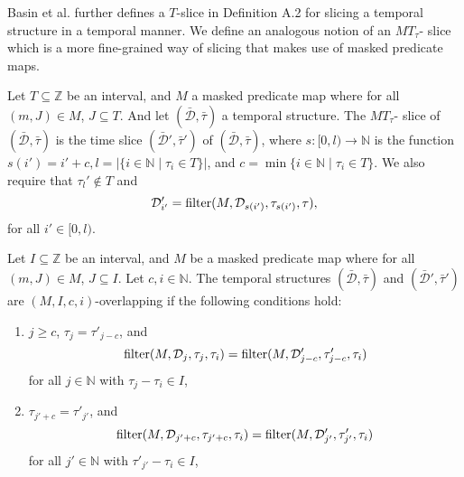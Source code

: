 Basin et al. \cite{Basin2016} further defines a $T$-slice in Definition A.2 for slicing a temporal structure in a temporal manner.
We define an analogous notion of an $MT_{\tau}$- slice which is a more fine-grained way of slicing that makes use of masked predicate maps.
\begin{definition}
    \label{def:mt-slice}
    Let $T \subseteq \mathbb{Z}$ be an interval,
        and $M$ a masked predicate map
            where for all $(m, J) \in M$, $J \subseteq T$.
    And let $(\bar{\mathcal{D}}, \bar{\tau})$ a temporal structure.
    The $MT_{\tau}$- slice of $(\bar{\mathcal{D}}, \bar{\tau})$ is the time slice $(\bar{\mathcal{D}}', \bar{\tau}')$ of $(\bar{\mathcal{D}}, \bar{\tau})$, where $s:[0,l) \to \mathbb{N}$ is the function $s(i') = i' + c, l = |\{i \in \mathbb{N} \mid \tau_i \in T\}|$, and $c = \min\{i \in \mathbb{N} \mid \tau_i \in T \}$. 
    We also require that $\tau_l' \not\in T$ and 
    \begin{equation*}
        \mathcal{D}'_{i'} = \operatorname{filter}(M, \mathcal{D}_{s(i')}, \tau_{s(i')}, \tau),
    \end{equation*}
    for all $i' \in [0,l)$.
\end{definition}


\begin{definition}
    \label{def:overlapping-ext}
    Let $I \subseteq \mathbb{Z}$ be an interval, and $M$ be a masked predicate map where for all $(m, J) \in M$, $J \subseteq I$.
    Let $c,i \in \mathbb{N}$.
    The temporal structures $(\bar{\mathcal{D}}, \bar{\tau})$ and $(\bar{\mathcal{D}}', \bar{\tau}')$ are $(M,I,c,i)$-overlapping if the following conditions hold:
    \renewcommand{\labelenumi}{\arabic{enumi}.}
    \begin{enumerate}
        \item 
            $j \geq c$,
            $\tau_j = \tau'_{j-c}$,
            and
            \begin{equation*}
                \operatorname{filter}(M, \mathcal{D}_j, \tau_j, \tau_i)
                = \operatorname{filter}(M, \mathcal{D}'_{j-c}, \tau'_{j-c}, \tau_i)
            \end{equation*}
            for all $j \in \mathbb{N}$ with $\tau_j - \tau_i \in I$,
        \item
            $\tau_{j'+c} = \tau'_{j'}$,
            and
            \begin{equation*}
                \operatorname{filter}(M, \mathcal{D}_{j'+c}, \tau_{j'+c}, \tau_i)
                = \operatorname{filter}(M, \mathcal{D}'_{j'}, \tau'_{j'}, \tau_i)
            \end{equation*}
            for all $j' \in \mathbb{N}$ with $\tau'_{j'} - \tau_i \in I$,
    \end{enumerate}
\end{definition}

